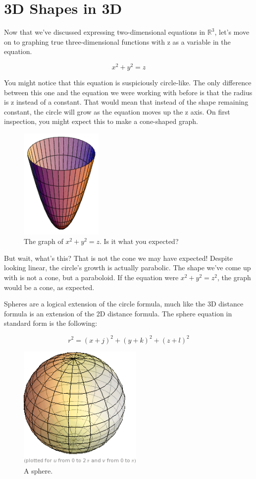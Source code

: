 \documentclass{article}
\begin{document}
\section{3D Shapes in 3D}
Now that we've discussed expressing two-dimensional equations in
$\mathbb{R}^3$, let's move on to graphing true three-dimensional functions with
z as a variable in the equation.

$$x^2 + y^2 = z$$

You might notice that this equation is suspiciously circle-like. The only
difference between this one and the equation we were working with before is
that the radius is z instead of a constant. That would mean that instead of the
shape remaining constant, the circle will grow as the equation moves up the z
axis. On first inspection, you might expect this to make a cone-shaped graph.

\begin{figure}[H]
	\centering
	\includegraphics[width=4cm]{paraboloid}
	\caption{The graph of $x^2 + y^2 = z$. Is it what you expected?}
	\label{fig:paraboloid}
\end{figure}

But wait, what's this? That is not the cone we may have expected! Despite
looking linear, the circle's growth is actually parabolic. The shape we've
come up with is not a cone, but a paraboloid. If the equation were
$x^2 + y^2 = z^2$, the graph would be a cone, as expected.

Spheres are a logical extension of the circle formula, much like the 3D
distance formula is an extension of the 2D distance formula. The sphere
equation in standard form is the following:

$$r^2 = (x + j)^2 + (y + k)^2 + (z + l)^2$$

\begin{figure}[H]
	\centering
	\includegraphics[width=6cm]{sphere}
	\caption{A sphere.}
	\label{fig:sphere}
\end{figure}
\end{document}
